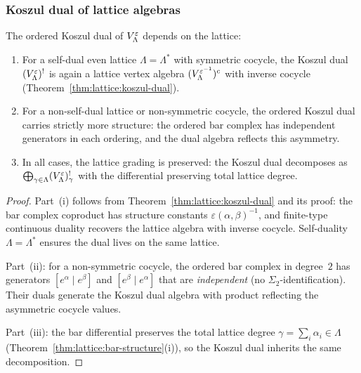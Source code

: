 \subsubsection{Koszul dual of lattice algebras}

\begin{theorem}
\label{thm:lattice-ordered-koszul-dual}
The ordered Koszul dual of $V_\Lambda^\varepsilon$ depends on
the lattice:
\begin{enumerate}[label=\textup{(\roman*)}]
\item For a self-dual even lattice $\Lambda = \Lambda^*$
 with symmetric cocycle, the Koszul dual
 $(V_\Lambda^\varepsilon)^!$ is again a lattice vertex algebra
 $(V_\Lambda^{\varepsilon^{-1}})^c$ with inverse cocycle
 \textup{(}Theorem~\textup{\ref{thm:lattice:koszul-dual}}\textup{)}.
\item For a non-self-dual lattice or non-symmetric cocycle, the
 ordered Koszul dual carries strictly more structure: the
 ordered bar complex has independent generators in each ordering,
 and the dual algebra reflects this asymmetry.
\item In all cases, the lattice grading is preserved: the Koszul dual
 decomposes as $\bigoplus_{\gamma \in \Lambda}
 (V_\Lambda^\varepsilon)^!_\gamma$ with the differential
 preserving total lattice degree.
\end{enumerate}
\end{theorem}

\begin{proof}
Part~(i) follows from Theorem~\ref{thm:lattice:koszul-dual} and its
proof: the bar complex coproduct has structure constants
$\varepsilon(\alpha,\beta)^{-1}$, and finite-type continuous duality
recovers the lattice algebra with inverse cocycle. Self-duality
$\Lambda = \Lambda^*$ ensures the dual lives on the same lattice.

Part~(ii): for a non-symmetric cocycle, the ordered bar complex in
degree~$2$ has generators $[e^\alpha \mid e^\beta]$ and
$[e^\beta \mid e^\alpha]$ that are \emph{independent} (no
$\Sigma_2$-identification). Their duals generate the Koszul dual
algebra with product reflecting the asymmetric cocycle values.

Part~(iii): the bar differential preserves the total lattice degree
$\gamma = \sum_i \alpha_i \in \Lambda$
(Theorem~\ref{thm:lattice:bar-structure}(i)), so the Koszul dual
inherits the same decomposition.
\end{proof}

